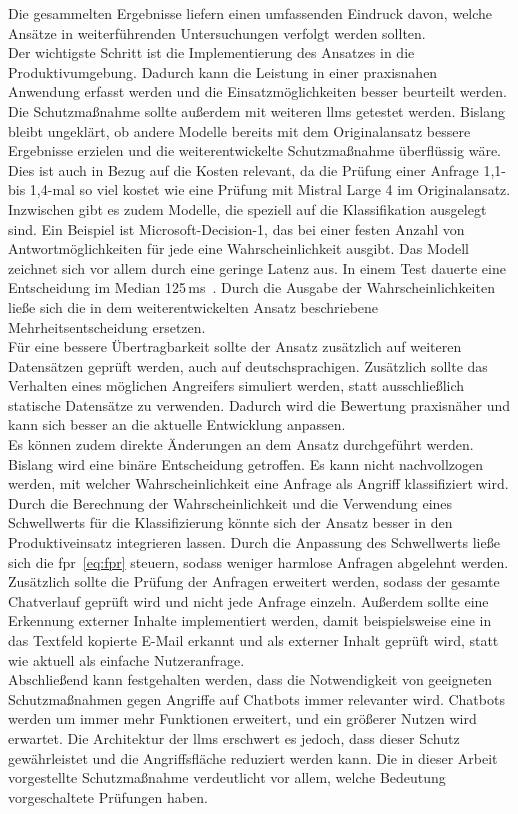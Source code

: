 Die gesammelten Ergebnisse liefern einen umfassenden Eindruck davon, welche Ansätze in weiterführenden Untersuchungen verfolgt werden sollten. \\
Der wichtigste Schritt ist die Implementierung des Ansatzes in die Produktivumgebung. Dadurch kann die Leistung in einer praxisnahen Anwendung erfasst werden
und die Einsatzmöglichkeiten besser beurteilt werden. \\
Die Schutzmaßnahme sollte außerdem mit weiteren \acp{llm} getestet werden. Bislang bleibt ungeklärt, ob andere Modelle bereits mit dem Originalansatz bessere
Ergebnisse erzielen und die weiterentwickelte Schutzmaßnahme überflüssig wäre. Dies ist auch in Bezug auf die Kosten relevant, da die Prüfung einer Anfrage 
1,1- bis 1,4-mal so viel kostet wie eine Prüfung mit Mistral Large 4 im Originalansatz.
Inzwischen gibt es zudem Modelle, die speziell auf die Klassifikation ausgelegt sind. Ein Beispiel
ist Microsoft-Decision-1, das bei einer festen Anzahl von Antwortmöglichkeiten für jede eine Wahrscheinlichkeit ausgibt. Das Modell zeichnet sich vor allem durch 
eine geringe Latenz aus. In einem Test dauerte eine Entscheidung im Median 125\,ms~\cite{f01}. Durch die Ausgabe der Wahrscheinlichkeiten ließe sich die 
in dem weiterentwickelten Ansatz beschriebene Mehrheitsentscheidung ersetzen. \\
Für eine bessere Übertragbarkeit sollte der Ansatz zusätzlich auf weiteren Datensätzen geprüft werden, auch auf deutschsprachigen. Zusätzlich sollte das Verhalten eines
möglichen Angreifers simuliert werden, statt ausschließlich statische Datensätze zu verwenden. Dadurch wird die Bewertung praxisnäher und kann sich besser an die
aktuelle Entwicklung anpassen. \\
Es können zudem direkte Änderungen an dem Ansatz durchgeführt werden. Bislang wird eine binäre Entscheidung getroffen. Es kann nicht nachvollzogen werden, mit
welcher Wahrscheinlichkeit eine Anfrage als Angriff klassifiziert wird. Durch die Berechnung der Wahrscheinlichkeit und die Verwendung eines Schwellwerts für die
Klassifizierung könnte sich der Ansatz besser in den Produktiveinsatz integrieren lassen. Durch die Anpassung des Schwellwerts ließe sich die \ac{fpr}~\eqref{eq:fpr} steuern,
sodass weniger harmlose Anfragen abgelehnt werden. Zusätzlich sollte die Prüfung der Anfragen erweitert werden, sodass der gesamte Chatverlauf geprüft wird
und nicht jede Anfrage einzeln. Außerdem sollte eine Erkennung externer Inhalte implementiert werden, damit beispielsweise eine in das Textfeld
kopierte E-Mail erkannt und als externer Inhalt geprüft wird, statt wie aktuell als einfache Nutzeranfrage. \\
Abschließend kann festgehalten werden, dass die Notwendigkeit von geeigneten Schutzmaßnahmen gegen Angriffe auf Chatbots immer relevanter
wird. Chatbots werden um immer mehr Funktionen erweitert, und ein größerer Nutzen wird erwartet. Die Architektur der \acp{llm} erschwert es jedoch, dass dieser Schutz
gewährleistet und die Angriffsfläche reduziert werden kann. Die in dieser Arbeit vorgestellte Schutzmaßnahme verdeutlicht vor allem, welche Bedeutung
vorgeschaltete Prüfungen haben.
